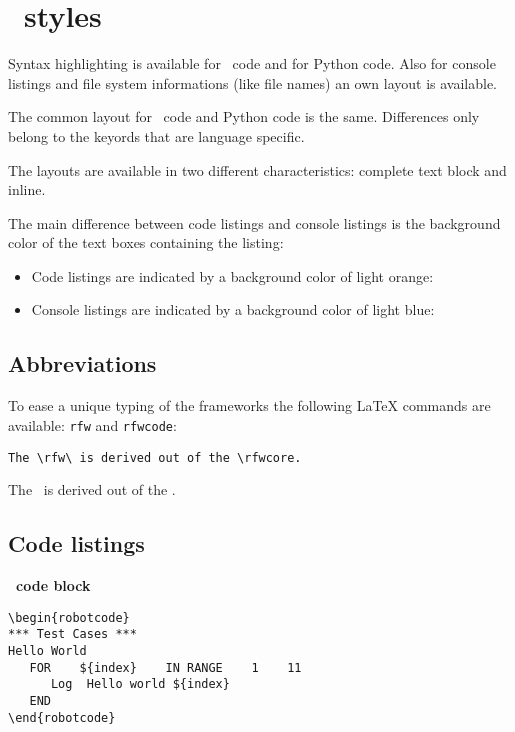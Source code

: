 \documentclass[a4paper,10pt]{report}
\begin{document}
\chapter{\rfw\ styles}

Syntax highlighting is available for \rfw\ code and for Python code. Also for console listings and file system informations (like file names)
an own layout is available.

The common layout for \rfw\ code and Python code is the same. Differences only belong to the keyords that are language specific.

The layouts are available in two different characteristics: complete text block and inline.

The main difference between code listings and console listings is the background color of the text boxes containing the listing:

\begin{itemize}
   \item Code listings are indicated by a background color of light orange: 
   \item Console listings are indicated by a background color of light blue: 
\end{itemize}


\section{Abbreviations}

To ease a unique typing of the frameworks the following LaTeX commands are available: \texttt{rfw} and \texttt{rfwcode}:

\begin{verbatim}
The \rfw\ is derived out of the \rfwcore.
\end{verbatim}

The \rfw\ is derived out of the \rfwcore.

\section{Code listings}

\textbf{\rfw\ code block}
\begin{verbatim}
\begin{robotcode}
*** Test Cases ***
Hello World
   FOR    ${index}    IN RANGE    1    11
      Log  Hello world ${index}
   END
\end{robotcode}
\end{verbatim}
\end{document}
